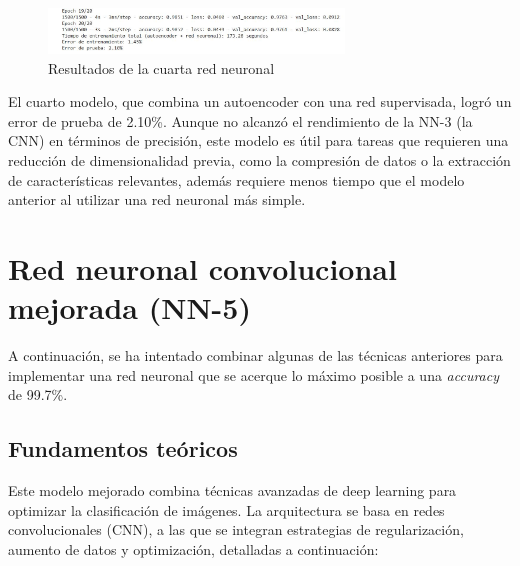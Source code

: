 \begin{figure}[H]
	\centering
	\includegraphics[width=0.7\textwidth]{imgs/results-red4.JPG}
	\caption{Resultados de la cuarta red neuronal}
	\label{fig:results-red4}
\end{figure}

El cuarto modelo, que combina un autoencoder con una red supervisada, logró un error de prueba de 2.10\%. Aunque no alcanzó el rendimiento de la NN-3 (la CNN) en términos de precisión, este modelo es útil para tareas que requieren una reducción de dimensionalidad previa, como la compresión de datos o la extracción de características relevantes, además requiere menos tiempo que el modelo anterior al utilizar una red neuronal más simple.


\section{Red neuronal convolucional mejorada (NN-5)}

A continuación, se ha intentado combinar algunas de las técnicas anteriores para implementar una red neuronal que se acerque lo máximo posible a una \textit{accuracy} de 99.7\%.

\subsection{Fundamentos teóricos}

Este modelo mejorado combina técnicas avanzadas de deep learning para optimizar la clasificación de imágenes. La arquitectura se basa en redes convolucionales (CNN), a las que se integran estrategias de regularización, aumento de datos y optimización, detalladas a continuación:

